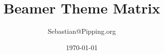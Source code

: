 \documentclass{beamer}
\title[Short Title]{Beamer Theme Matrix}
\author{Sebastian\linebreak[0]{}@Pipping.org}
\institute{Institute}
\date{\today}
\begin{document}
	\frame{\titlepage}
	
\end{document}

